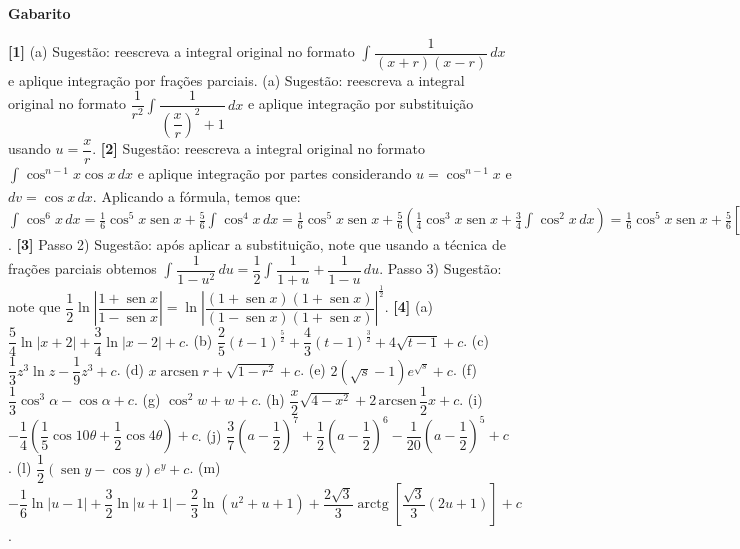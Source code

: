 \documentclass[12pt,a4paper]{article}
\DeclareMathOperator{\sen}{sen}
\DeclareMathOperator{\arcsen}{arcsen}
\DeclareMathOperator{\arctg}{arctg}
\newcommand{\integral}[4]{\displaystyle\int_{#3}^{#4} #1\,d#2}
\begin{document}
\newpage
\begin{center}
\textbf{Gabarito}
\end{center}
\textbf{[1]} (a) Sugestão: reescreva a integral original no formato $\integral{\dfrac{1}{(x + r)(x - r)}}{x}{}{}{}$ e aplique integração 
por frações parciais. 
(a) Sugestão: reescreva a integral original no formato $\dfrac{1}{r^2}\integral{\dfrac{1}{\left(\dfrac{x}{r}\right)^2 + 1}}{x}{}{}{}$ e aplique integração 
por substituição usando $u = \dfrac{x}{r}$. 
\textbf{[2]} Sugestão: reescreva a integral original no formato $\integral{\cos^{n-1} x\cos x}{x}{}{}{}$ e aplique integração por partes 
considerando $u = \cos^{n-1}x$ e $dv = \cos x \,dx$. Aplicando a fórmula, temos que: 
$\integral{\cos^6 x}{x}{}{}{} = \frac{1}{6}\cos^{5} x\sen x + \frac{5}{6}\integral{\cos^{4} x}{x}{}{} = 
\frac{1}{6}\cos^{5} x\sen x + \frac{5}{6}\left(\frac{1}{4}\cos^{3} x\sen x + \frac{3}{4}\integral{\cos^2 x}{x}{}{}\right) = 
\frac{1}{6}\cos^{5} x\sen x + \frac{5}{6}\left[\frac{1}{4}\cos^{3} x\sen x + \frac{3}{4}\left(\frac{1}{2}\cos x\sen x + \frac{1}{2}\integral{1}{x}{}{}\right)\right] = 
\frac{1}{6}\cos^{5} x\sen x + \frac{5}{24}\cos^{3} x\sen x + \frac{5}{16}\cos x\sen x + \frac{5}{16}x + c$. 
\textbf{[3]} Passo 2) Sugestão: após aplicar a substituição, note que usando a técnica de frações parciais obtemos 
$\integral{\dfrac{1}{1 - u^2}}{u}{}{} = \dfrac{1}{2}\integral{\dfrac{1}{1 + u} + \dfrac{1}{1 - u}}{u}{}{}$. 
Passo 3) Sugestão: note que 
$\dfrac{1}{2}\ln\left|\dfrac{1 + \sen x}{1 - \sen x}\right| = \ln\left|\dfrac{(1 + \sen x)(1 + \sen x)}{(1 - \sen x)(1 + \sen x)}\right|^{\frac{1}{2}}$. 
\textbf{[4]} (a) $\dfrac{5}{4}\ln|x + 2| + \dfrac{3}{4}\ln|x - 2| + c$. 
(b) $\dfrac{2}{5}(t - 1)^{\frac{5}{2}} + \dfrac{4}{3}(t - 1)^{\frac{3}{2}} + 4\sqrt{t - 1} + c$. 
(c) $\dfrac{1}{3}z^3\ln z - \dfrac{1}{9}z^3 + c$. 
(d) $x\arcsen r + \sqrt{1 - r^2} + c$. 
(e) $2\left(\sqrt{s} - 1\right)e^{\sqrt{s}} + c$. 
(f) $\dfrac{1}{3}\cos^3 \alpha - \cos \alpha + c$. 
(g) $\cos^2 w + w + c$. 
(h) $\dfrac{x}{2}\sqrt{4 - x^2} + 2\,\textrm{arcsen}\,\dfrac{1}{2}x + c$. 
(i) $-\dfrac{1}{4}\left(\dfrac{1}{5}\cos 10\theta + \dfrac{1}{2}\cos 4\theta\right) + c$. 
(j) $\dfrac{3}{7}\left(a-\dfrac{1}{2}\right)^7 + \dfrac{1}{2}\left(a-\dfrac{1}{2}\right)^6 - \dfrac{1}{20}\left(a-\dfrac{1}{2}\right)^5 + c$. 
(l) $\dfrac{1}{2}(\sen y - \cos y)e^y + c$.
(m) $-\dfrac{1}{6}\ln|u - 1| + \dfrac{3}{2}\ln|u + 1| - \dfrac{2}{3}\ln\left(u^2 + u + 1\right) + \dfrac{2\sqrt{3}}{3}\arctg\left[\dfrac{\sqrt{3}}{3}(2u + 1)\right] + c$. 
\end{document}
